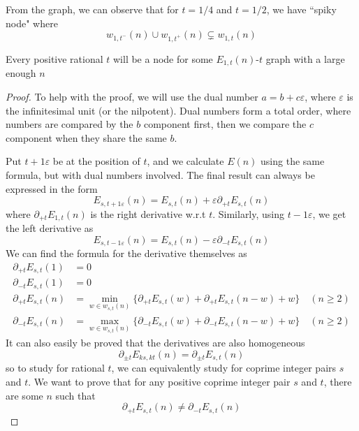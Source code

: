 \documentclass[]{article}
\begin{document}
From the graph, we can observe that for $t = 1/4$ and $t = 1/2$, we have ``spiky node" where
\[
 w_{1,t^-}(n) \cup w_{1,t^+}(n)  \subsetneq w_{1,t}(n)
\]

\vspace{1cm}
\begin{lemma}[Node]
	Every positive rational $t$ will be a node for some $E_{1,t}(n)$-$t$ graph with a large enough $n$
\end{lemma}
\begin{proof}
	To help with the proof, we will use the dual number $a = b + c\varepsilon $, where $\varepsilon$ is the infinitesimal unit (or the nilpotent). Dual numbers form a total order, where numbers are compared by the $b$ component first, then we compare the $c$ component when they share the same $b$.

	Put $t + 1\varepsilon$ be at the position of $t$, and we calculate $E(n)$ using the same formula, but with dual numbers involved. The final result can always be expressed in the form
	\[
	E_{s,t + 1\varepsilon}(n) = E_{s,t}(n) + \varepsilon \partial_{+t}E_{s,t}(n)
	\]
	where $\partial_{+t}E_{1,t}(n)  $ is the right derivative w.r.t $t$. Similarly, using $t - 1\varepsilon$, we get the left derivative as
	\[
	E_{s,t - 1\varepsilon}(n) = E_{s,t}(n) - \varepsilon \partial_{-t}E_{s,t}(n)
	\]
	We can find the formula for the derivative themselves as
	\begin{align*}
	\partial_{+t}E_{s,t}(1) &= 0\\
	 \partial_{-t}E_{s,t}(1) &= 0 \\
	 \partial_{+t}E_{s,t}(n) &= \min_{w\in w_{s,t}(n)}\{\partial_{+t}E_{s,t}(w) + \partial_{+t}E_{s,t}(n-w) + w\} \quad(n\geq 2)\\
	 \partial_{-t}E_{s,t}(n) &= \max_{w\in w_{s,t}(n)}\{\partial_{-t}E_{s,t}(w) + \partial_{-t}E_{s		,t}(n-w) + w\} \quad(n\geq 2)
	\end{align*}
	It can also easily be proved that the derivatives are also homogeneous
	\[
	\partial_{\pm t}E_{ks,kt}(n) = \partial_{\pm t}E_{s,t}(n)
	\]
	so to study for rational $t$, we can equivalently study for coprime integer pairs $s$ and $t$. We want to prove that for any positive coprime integer pair $s$ and $t$, there are some $n$ such that
	\[
	\partial_{+t}E_{s,t}(n) \neq \partial_{-t}E_{s,t}(n)
	\]



\end{proof}
\end{document}
